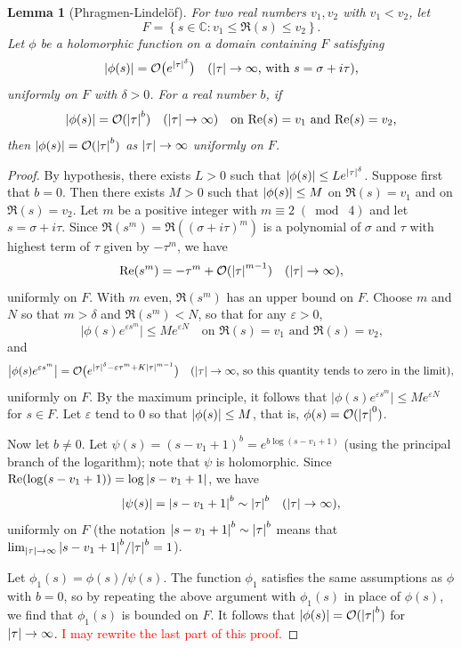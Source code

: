 \documentclass[10pt,leqno,twoside]{article}
\theoremstyle{plain}
\newtheorem{lemma}[lem]{Lemma}
\theoremstyle{definition}
\numberwithin{equation}{section}
\numberwithin{lem}{section}
\newcommand{\cbr}[1]{\left\{#1\right\}}
\newcommand{\smod}[1]{\;(\bmod\; #1)}
\newcommand{\sai}[1]{\textcolor{red}{#1}}
\begin{document}
\begin{lemma}[Phragmen-Lindel\"of]\label{lem: miyake lem 4.3.4}
    For two real numbers $v_1,v_2$ with $v_1<v_2$, let 
    \[F = \cbr{s\in \mathbb C : v_1\leq \Re(s)\leq v_2}.\] Let $\phi$ be a holomorphic function on a domain containing $F$ satisfying \[\abs{\phi(s)} = \mathcal O\big(e^{\abs{\tau}^\delta}\big)\quad \textup{($\abs{\tau}\to\infty$, with $s = \sigma + i\tau$),}\]
    uniformly on $F$ with $\delta >0$. For a real number $b$, if 
    \[\abs{\phi(s)} = \mathcal O(\abs{\tau}^b)\quad (\abs{\tau}\to\infty) \quad \text{on $\Re(s) = v_1$ and $\Re(s) = v_2$,}\]
    then $\abs{\phi(s)} = \mathcal O(\abs{\tau}^b)$ as $\abs{\tau}\to\infty$ uniformly on $F$.
\end{lemma}
\begin{proof}
    By hypothesis, there exists $L>0$ such that $\abs{\phi(s)}\leq Le^{\abs{\tau}^\delta}$. Suppose first that $b = 0$. Then there exists $M>0$ such that $\abs{\phi(s)}\leq M$ on $\Re(s) = v_1$ and on $\Re(s) = v_2$. Let $m$ be a positive integer with $m\equiv 2\smod 4$ and let $s = \sigma + i \tau$. Since $\Re(s^m) = \Re((\sigma  + i\tau)^m)$ is a polynomial of $\sigma$ and $\tau$ with highest term of $\tau$ given by $-\tau^m$, we have 
    \[\Re(s^m) = -\tau^m + \mathcal O(\abs{\tau}^{m-1})\quad (\abs{\tau}\to\infty),\] uniformly on $F$. With $m$ even, $\Re(s^m)$ has an upper bound on $F$. Choose $m$ and $N$ so that $m>\delta$ and $\Re(s^m)<N$, so that for any $\varepsilon>0$,
    \[\big|\phi(s)e^{\varepsilon s^m}\big|\leq Me^{\varepsilon N}\quad \text{on $\Re(s) = v_1$ and $\Re(s) = v_2$,}\]
    and
    \[\big|\phi(s)e^{\varepsilon s^m}\big| = \mathcal O\big(e^{\abs{\tau}^\delta -\varepsilon\tau^m + K\abs{\tau}^{m-1}}\big)\quad (\abs{\tau}\to\infty\text{, so this quantity tends to zero in the limit}),\] uniformly on $F$. By the maximum principle, it follows that $\big|\phi(s)e^{\varepsilon s^m}\big|\leq Me^{\varepsilon N}$ for $s\in F$. Let $\varepsilon$ tend to $0$ so that $\abs{\phi(s)}\leq M$, that is, $\phi(s) = \mathcal O(\abs{\tau}^0)$.

    Now let $b\neq 0$. Let $\psi(s) = (s-v_1+1)^b = e^{b\log(s-v_1+1)}$ (using the principal branch of the logarithm); note that $\psi$ is holomorphic. Since $\Re(\log(s-v_1+1)) = \log\abs{s-v_1+1}$, we have 
    \[\abs{\psi(s)} = \abs{s-v_1+1}^b\sim \abs{\tau}^b\quad (\abs{\tau}\to\infty),\] uniformly on $F$ (the notation $\abs{s-v_1+1}^b\sim \abs{\tau}^b$ means that $\lim_{\abs{\tau}\to\infty} \abs{s-v_1+1}^b/\abs{\tau}^b = 1$).

    Let $\phi_1(s) = \phi(s)/\psi(s)$. The function $\phi_1$ satisfies the same assumptions as $\phi$ with $b = 0$, so by repeating the above argument with $\phi_1(s)$ in place of $\phi(s)$, we find that $\phi_1(s)$ is bounded on $F$. It follows that $\abs{\phi(s)} = \mathcal O(\abs{\tau}^b)$ for $\abs{\tau}\to\infty$. \sai{I may rewrite the last part of this proof.}
\end{proof}
\end{document}
